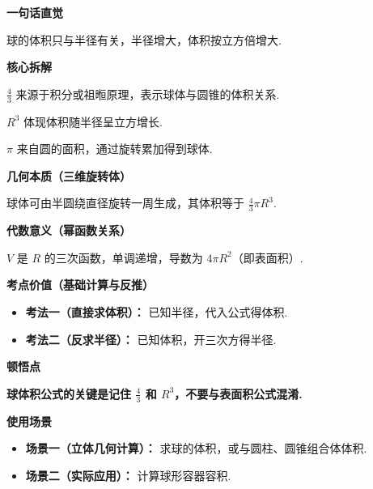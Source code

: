 \begin{explanationbox}
	\textbf{\textcolor{CExplanation}{一句话直觉}}

	球的体积只与半径有关，半径增大，体积按立方倍增大.

	\medskip
	\textbf{\textcolor{CExplanation}{核心拆解}}
	\begin{description}[style=nextline, leftmargin=2.8em, labelsep=0.5em, itemsep=0.45em]
		\item[\textbf{要点一（系数来源）：}] $\frac{4}{3}$ 来源于积分或祖暅原理，表示球体与圆锥的体积关系.
		\item[\textbf{要点二（立方关系）：}] $R^3$ 体现体积随半径呈立方增长.
		\item[\textbf{要点三（圆周率引入）：}] $\pi$ 来自圆的面积，通过旋转累加得到球体.
	\end{description}

	\medskip
	\textbf{\textcolor{CExplanation}{几何本质（三维旋转体）}}

	球体可由半圆绕直径旋转一周生成，其体积等于 $\frac{4}{3}\pi R^3$.

	\medskip
	\textbf{\textcolor{CExplanation}{代数意义（幂函数关系）}}

	$V$ 是 $R$ 的三次函数，单调递增，导数为 $4\pi R^2$（即表面积）.

	\medskip
	\textbf{\textcolor{CExplanation}{考点价值（基础计算与反推）}}
	\begin{itemize}[leftmargin=*, itemsep=0.5em, topsep=0.4em]
		\item \textbf{考法一（直接求体积）：} 已知半径，代入公式得体积.
		\item \textbf{考法二（反求半径）：} 已知体积，开三次方得半径.
	\end{itemize}

	\medskip
	\textbf{\textcolor{CExplanation}{顿悟点}}

	\textbf{球体积公式的关键是记住 $\frac{4}{3}$ 和 $R^3$，不要与表面积公式混淆.}

	\medskip
	\textbf{\textcolor{CExplanation}{使用场景}}
	\begin{itemize}[leftmargin=*, itemsep=0.5em, topsep=0.4em]
		\item \textbf{场景一（立体几何计算）：} 求球的体积，或与圆柱、圆锥组合体体积.
		\item \textbf{场景二（实际应用）：} 计算球形容器容积.
	\end{itemize}
\end{explanationbox}
